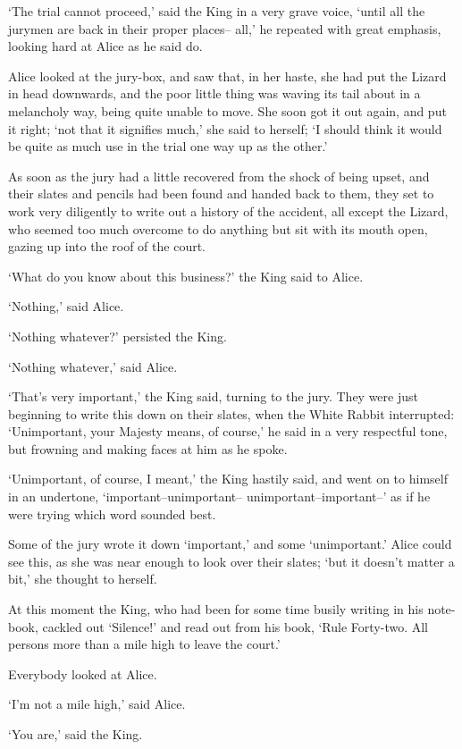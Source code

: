 \documentclass[statementpaper,twoside,openany]{memoir}
\begin{document}
`The trial cannot proceed,' said the King in a very grave voice, `until all the jurymen are back in their proper places-- all,' he repeated with great emphasis, looking hard at Alice as he said do.

Alice looked at the jury-box, and saw that, in her haste, she had put the Lizard in head downwards, and the poor little thing was waving its tail about in a melancholy way, being quite unable to move. She soon got it out again, and put it right; `not that it signifies much,' she said to herself; `I should think it would be quite as much use in the trial one way up as the other.'

As soon as the jury had a little recovered from the shock of being upset, and their slates and pencils had been found and handed back to them, they set to work very diligently to write out a history of the accident, all except the Lizard, who seemed too much overcome to do anything but sit with its mouth open, gazing up into the roof of the court.

`What do you know about this business?' the King said to Alice.

`Nothing,' said Alice.

`Nothing whatever?' persisted the King.

`Nothing whatever,' said Alice.

`That's very important,' the King said, turning to the jury. They were just beginning to write this down on their slates, when the White Rabbit interrupted: `Unimportant, your Majesty means, of course,' he said in a very respectful tone, but frowning and making faces at him as he spoke.

`Unimportant, of course, I meant,' the King hastily said, and went on to himself in an undertone, `important--unimportant-- unimportant--important--' as if he were trying which word sounded best.

Some of the jury wrote it down `important,' and some `unimportant.' Alice could see this, as she was near enough to look over their slates; `but it doesn't matter a bit,' she thought to herself.

At this moment the King, who had been for some time busily writing in his note-book, cackled out `Silence!' and read out from his book, `Rule Forty-two. All persons more than a mile high to leave the court.'

Everybody looked at Alice.

`I'm not a mile high,' said Alice.

`You are,' said the King.
\end{document}
